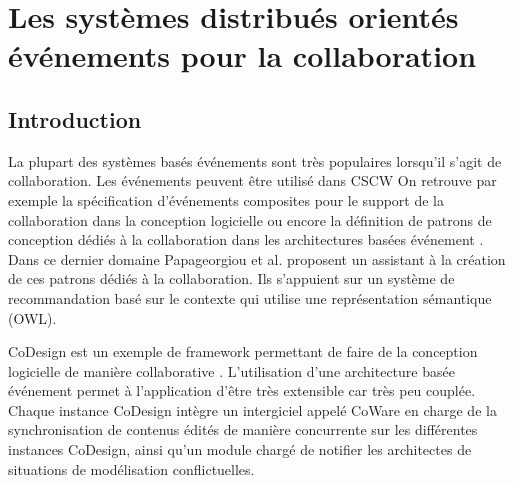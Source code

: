 
\section{Les systèmes distribués orientés événements pour la collaboration}

	\subsection{Introduction}
La plupart des systèmes basés événements sont très populaires lorsqu'il s'agit de 
collaboration\cite{Helmer2011}. Les événements peuvent être utilisé dans 
\gls{CSCW}
On retrouve par exemple la spécification 
d'événements composites 
pour le support de la collaboration dans la conception logicielle \cite{Yuan2002} 
ou encore la définition de patrons de conception dédiés à la collaboration dans les 
architectures basées événement \cite{Verginadis2009}. Dans ce dernier domaine 
Papageorgiou et al. \cite{Papageorgiou2011} proposent un assistant à la 
création de ces patrons dédiés à la collaboration. Ils s'appuient sur un système de 
recommandation basé sur le contexte qui utilise une représentation sémantique 
(\gls{OWL}).

CoDesign est un exemple de \gls{framework} permettant de faire de la 
conception logicielle de manière collaborative \cite{Bang2010}. L'utilisation d'une 
architecture basée événement permet à l'application d'être très extensible car très 
peu couplée. Chaque instance CoDesign intègre un intergiciel appelé CoWare en 
charge de la synchronisation de contenus édités de manière concurrente sur les 
différentes instances CoDesign, ainsi qu'un module chargé de notifier les 
architectes de situations de modélisation conflictuelles. 


